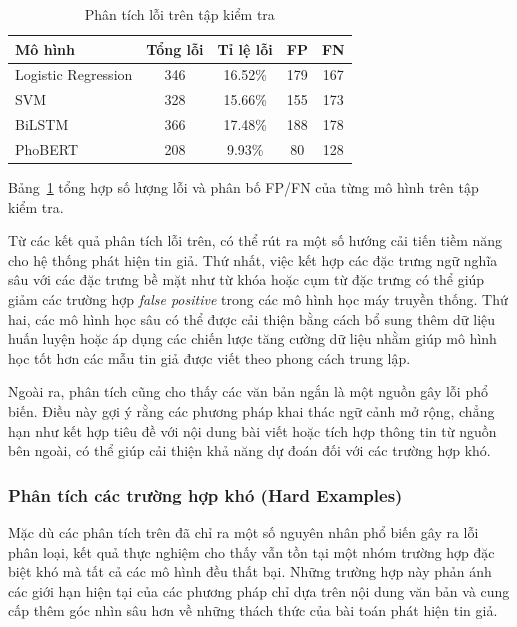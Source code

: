 \documentclass[12pt, a4paper]{report}
\newcommand{\phobertFP}{80}
\newcommand{\phobertFN}{128}
\newcommand{\lrErrors}{346}
\newcommand{\lrErrorRate}{16.52}
\newcommand{\lrFPcount}{179}
\newcommand{\lrFNcount}{167}
\newcommand{\svmErrors}{328}
\newcommand{\svmErrorRate}{15.66}
\newcommand{\svmFPcount}{155}
\newcommand{\svmFNcount}{173}
\newcommand{\bilstmErrors}{366}
\newcommand{\bilstmErrorRate}{17.48}
\newcommand{\bilstmFPcount}{188}
\newcommand{\bilstmFNcount}{178}
\newcommand{\phobertErrors}{208}
\newcommand{\phobertErrorRate}{9.93}
\begin{document}
\begin{table}[H]
\centering
\caption{Phân tích lỗi trên tập kiểm tra}
\label{tab:errors}
\begin{tabular}{lcccc}
\toprule
\textbf{Mô hình} & \textbf{Tổng lỗi} & \textbf{Tỉ lệ lỗi} & \textbf{FP} & \textbf{FN} \\
\midrule
Logistic Regression & \lrErrors & \lrErrorRate\% & \lrFPcount & \lrFNcount \\
SVM & \svmErrors & \svmErrorRate\% & \svmFPcount & \svmFNcount \\
BiLSTM & \bilstmErrors & \bilstmErrorRate\% & \bilstmFPcount & \bilstmFNcount \\
PhoBERT & \phobertErrors & \phobertErrorRate\% & \phobertFP & \phobertFN \\
\bottomrule
\end{tabular}
\end{table}

Bảng~\ref{tab:errors} tổng hợp số lượng lỗi và phân bố FP/FN của từng mô hình trên tập kiểm tra.

Từ các kết quả phân tích lỗi trên, có thể rút ra một số hướng cải tiến tiềm năng cho hệ thống phát hiện tin giả. Thứ nhất, việc kết hợp các đặc trưng ngữ nghĩa sâu với các đặc trưng bề mặt như từ khóa hoặc cụm từ đặc trưng có thể giúp giảm các trường hợp \textit{false positive} trong các mô hình học máy truyền thống. Thứ hai, các mô hình học sâu có thể được cải thiện bằng cách bổ sung thêm dữ liệu huấn luyện hoặc áp dụng các chiến lược tăng cường dữ liệu nhằm giúp mô hình học tốt hơn các mẫu tin giả được viết theo phong cách trung lập.

Ngoài ra, phân tích cũng cho thấy các văn bản ngắn là một nguồn gây lỗi phổ biến. Điều này gợi ý rằng các phương pháp khai thác ngữ cảnh mở rộng, chẳng hạn như kết hợp tiêu đề với nội dung bài viết hoặc tích hợp thông tin từ nguồn bên ngoài, có thể giúp cải thiện khả năng dự đoán đối với các trường hợp khó.

\subsubsection{Phân tích các trường hợp khó (Hard Examples)}

Mặc dù các phân tích trên đã chỉ ra một số nguyên nhân phổ biến gây ra lỗi phân loại, kết quả thực nghiệm cho thấy vẫn tồn tại một nhóm trường hợp đặc biệt khó mà tất cả các mô hình đều thất bại. Những trường hợp này phản ánh các giới hạn hiện tại của các phương pháp chỉ dựa trên nội dung văn bản và cung cấp thêm góc nhìn sâu hơn về những thách thức của bài toán phát hiện tin giả.
\end{document}
